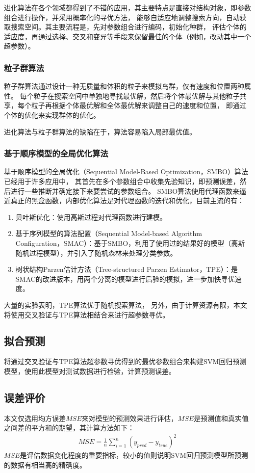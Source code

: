 进化算法在各个领域都得到了不错的应用，其主要特点是直接对结构对象，即参数组合进行操作，并采用概率化的寻优方法，
能够自适应地调整搜索方向，自动获取搜索空间。其主要流程是，先对参数组合进行编码，初始化种群，
评估个体的适应度，再通过选择、交叉和变异等手段来保留最佳的个体（例如，改动其中一个超参数）。

\subsubsection{粒子群算法}

粒子群算法通过设计一种无质量和体积的粒子来模拟鸟群，仅有速度和位置两种属性。
每个粒子在搜索空间中单独地寻找最优解，然后将个体最优解与其他粒子共享，每个粒子再根据个体最优解和全体最优解来调整自己的速度和位置，
即通过个体的优化来实现群体的优化。

进化算法与粒子群算法的缺陷在于，算法容易陷入局部最优值。

\subsubsection{基于顺序模型的全局优化算法}

基于顺序模型的全局优化（Sequential Model-Based Optimization，SMBO）算法已经用于许多应用中，
其首先在多个参数组合中收集先验知识，即预测误差，然后进行一些推断并确定接下来要尝试的参数组合。
SMBO算法使用代理函数来逼近真正的黑盒函数，内部优化算法是对代理函数的迭代和优化，目前主流的有：
\begin{enumerate}
    \item 贝叶斯优化：使用高斯过程对代理函数进行建模。
    \item 基于序列模型的算法配置（Sequential Model-based Algorithm Configuration，SMAC）：基于SMBO，利用了使用过的结果好的模型（高斯随机过程模型），并引入了随机森林来处理分类参数。
    \item 树状结构Parzen估计方法（Tree-structured Parzen Estimator，TPE）：是SMAC的改进版本，用两个分离的模型进行后验的模拟，进一步加快寻优速度。
\end{enumerate}

大量的实验表明，TPE算法优于随机搜索算法\cite{bergstra2011algorithms}，
另外，由于计算资源有限，本文将使用交叉验证与TPE算法相结合来进行超参数寻优。

\subsection{拟合预测}

将通过交叉验证与TPE算法超参数寻优得到的最优参数组合来构建SVM回归预测模型，使用此模型对测试数据进行检验，计算预测误差。

\subsection{误差评价}

本文仅选用均方误差$MSE$来对模型的预测效果进行评估，$MSE$是预测值和真实值之间差的平方和的期望，其计算方法如下：
\begin{align}
    MSE=\frac{1}{n}\sum_{i=1}^n(y_{pred}-y_{true})^2
\end{align}
$MSE$是评估数据变化程度的重要指标，较小的值则说明SVM回归预测模型所预测的数据有相当高的精确度。